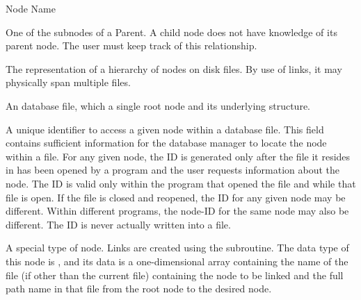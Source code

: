 \begin{Ventryi}{Node Name}
\item [Child]
      One of the subnodes of a Parent.
      A child node does not have knowledge of its parent node.
      The user must keep track of this relationship.
\item [Database]
      The representation of a hierarchy of nodes on disk files.
      By use of links, it may physically span multiple files.
\item [File]
      An database file, which a single root node and its underlying structure.
\item [ID]
      A unique identifier to access a given node within a database file.
      This field contains sufficient information for the database manager
      to locate the node within a file.
      For any given node, the ID is generated only after the file it
      resides in has been opened by a program and the user requests
      information about the node.
      The ID is valid only within the program that opened the file and
      while that file is open.
      If the file is closed and reopened, the ID for any given node
      may be different. Within different programs, the node-ID for the
      same node may also be different.
      The ID is never actually written into a file.
\item [Link-Node]
      A special type of node.
      Links are created using the
      \hyperlink{create_link}{}
      subroutine.
      The data type of this node is , and its data is a
      one-dimensional array containing the name of the file (if other
      than the current file) containing the node to be linked and the
      full path name in that file from the root node to the desired
      node.


\end{Ventryi}
